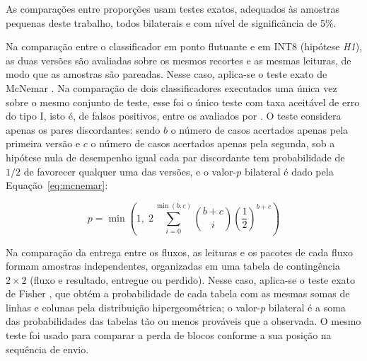 As comparações entre proporções usam testes exatos, adequados às amostras pequenas deste
trabalho, todos bilaterais e com nível de significância de 5\%.

Na comparação entre o classificador em ponto flutuante e em INT8 (hipótese \textit{H1}),
as duas versões são avaliadas sobre os mesmos recortes e as mesmas leituras, de modo que
as amostras são pareadas. Nesse caso, aplica-se o teste exato de McNemar
\cite{mcnemar1947}. Na comparação de dois classificadores executados uma única vez sobre o
mesmo conjunto de teste, esse foi o único teste com taxa aceitável de erro do tipo I, isto
é, de falsos positivos, entre os avaliados por . O teste
considera apenas os pares discordantes: sendo $b$ o número de casos acertados apenas pela
primeira versão e $c$ o número de casos acertados apenas pela segunda, sob a hipótese nula
de desempenho igual cada par discordante tem probabilidade de $1/2$ de favorecer qualquer
uma das versões, e o valor-$p$ bilateral é dado pela Equação~\eqref{eq:mcnemar}:

\begin{equation}
    \label{eq:mcnemar}
    p = \min\left(1,\; 2 \sum_{i=0}^{\min(b,c)} \binom{b+c}{i} \left(\frac{1}{2}\right)^{b+c}\right)
\end{equation}

Na comparação da entrega entre os fluxos, as leituras e os pacotes de cada fluxo formam
amostras independentes, organizadas em uma tabela de contingência $2 \times 2$ (fluxo e
resultado, entregue ou perdido). Nesse caso, aplica-se o teste exato de Fisher
\cite{fisher1934}, que obtém a probabilidade de cada tabela com as mesmas somas de linhas e
colunas pela distribuição hipergeométrica; o valor-$p$ bilateral é a soma das
probabilidades das tabelas tão ou menos prováveis que a observada. O mesmo teste foi usado
para comparar a perda de blocos conforme a sua posição na sequência de envio.
